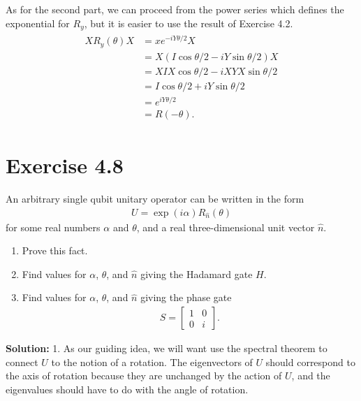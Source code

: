 \documentclass{book}
\begin{document}
    As for the second part, we can proceed from the power series which defines the exponential for $R_y$, but it is easier to use the result of Exercise 4.2.
    \begin{align}
    \begin{aligned}
        X R_y(\theta) X &= x e^{-i Y \theta /2} X \\
        &= X (I \cos \theta/2 - iY\sin\theta/2 ) X \\
        &= XIX \cos\theta/2 - i XYX\sin\theta/2 \\
        &= I \cos\theta/2 + i Y \sin\theta/2 \\
        &= e^{i Y \theta/2} \\
        &= R(-\theta).
    \end{aligned}
    \end{align}

\section*{Exercise 4.8}
    An arbitrary single qubit unitary operator can be written in the form
    \begin{align}
        U = \exp(i\alpha) R_{\hat{n}}(\theta)
    \end{align}
    for some real numbers $\alpha$ and $\theta$, and a real three-dimensional unit vector $\hat{n}$.
    
    \begin{enumerate}
        \item Prove this fact.
        \item Find values for $\alpha$, $\theta$, and $\hat{n}$ giving the Hadamard gate $H$.
        \item Find values for $\alpha$, $\theta$, and $\hat{n}$ giving the phase gate
        \begin{align}
            S = \begin{bmatrix}
                1 & 0 \\
                0 & i
            \end{bmatrix}.
        \end{align}
    \end{enumerate}
    
    \textbf{Solution:} 1. As our guiding idea, we will want use the spectral theorem to connect $U$ to the notion of a rotation. The eigenvectors of $U$ should correspond to the axis of rotation because they are unchanged by the action of $U$, and the eigenvalues should have to do with the angle of rotation. 
    
\end{document}
